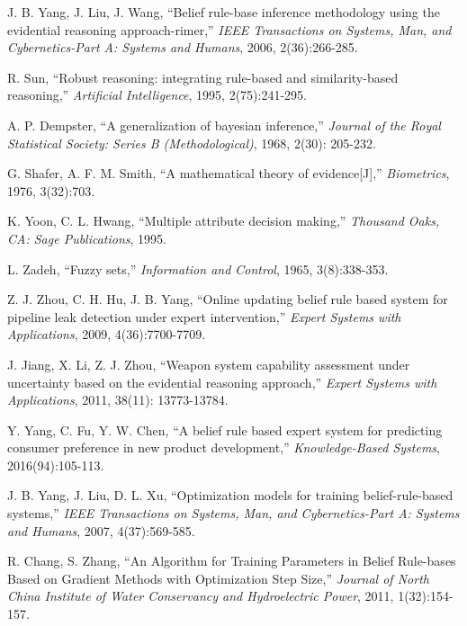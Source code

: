 \documentclass{ieeeaccess}
\begin{document}
\begin{thebibliography}{00}

     J. B. Yang, J. Liu, J. Wang, ``Belief rule-base inference methodology
    using the evidential reasoning approach-rimer,''
    \emph{IEEE Transactions on Systems, Man, and Cybernetics-Part A: Systems and Humans},
    2006, 2(36):266-285.

     R. Sun, ``Robust reasoning: integrating rule-based and similarity-based
    reasoning,'' \emph{Artificial Intelligence},
    1995, 2(75):241-295.

      A. P. Dempster, ``A generalization of bayesian inference,''
    \emph{Journal of the Royal Statistical Society: Series B (Methodological)},
    1968, 2(30): 205-232.

     G. Shafer, A. F. M. Smith, ``A mathematical theory of evidence[J],''
    \emph{Biometrics},
    1976, 3(32):703.

     K. Yoon, C. L. Hwang, ``Multiple attribute decision making,''
    \emph{Thousand Oaks, CA: Sage Publications},
    1995.

     L. Zadeh, ``Fuzzy sets,''
    \emph{Information and Control},
    1965, 3(8):338-353.

     Z. J. Zhou, C. H. Hu, J. B. Yang, ``Online updating belief rule based
    system for pipeline leak detection under expert intervention,''
    \emph{Expert Systems with Applications},
    2009, 4(36):7700-7709.

     J. Jiang, X. Li, Z. J. Zhou, ``Weapon system capability assessment
    under uncertainty based on the evidential reasoning approach,''
    \emph{Expert Systems with Applications},
    2011, 38(11): 13773-13784.

     Y. Yang, C. Fu, Y. W. Chen, ``A belief rule based expert system
    for predicting consumer preference in new product development,''
    \emph{Knowledge-Based Systems},
    2016(94):105-113.

     J. B. Yang, J. Liu, D. L. Xu, ``Optimization models for training
    belief-rule-based systems,''
    \emph{IEEE Transactions on Systems, Man, and Cybernetics-Part A: Systems and Humans},
    2007, 4(37):569-585.

     R. Chang, S. Zhang, ``An Algorithm for Training Parameters in Belief Rule-bases Based on
    Gradient Methods with Optimization Step Size,''
    \emph{Journal of North China Institute of Water Conservancy and Hydroelectric Power},
    2011, 1(32):154-157.


\end{thebibliography}
\end{document}
